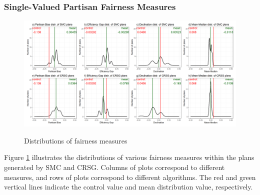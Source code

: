 \subsubsection{Single-Valued Partisan Fairness Measures}
\begin{landscape}
    \begin{figure}
        \centering
        \caption{Distributions of fairness measures}
        \includegraphics{img/fair.density.png}
        \label{fig:fair.density}
        \raggedright
    \end{figure}
\end{landscape}

Figure \ref{fig:fair.density} illustrates the distributions of various fairness measures within the plans generated by SMC and CRSG. Columns of plots correspond to different measures, and rows of plots correspond to different algorithms. The red and green vertical lines indicate the control value and mean distribution value, respectively. 